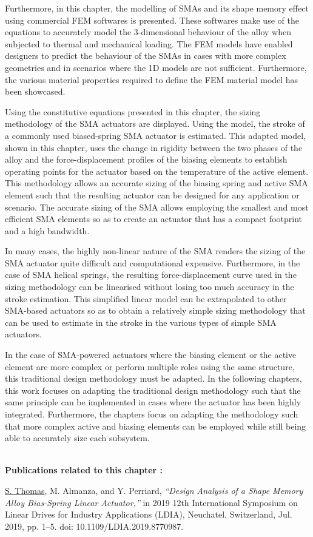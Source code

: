 Furthermore, in this chapter, the modelling of SMAs and its shape memory effect using commercial FEM softwares is presented. These softwares make use of the \cite{auricchioRobustIntegrationalgorithmFinitestrain2001} equations to accurately model the 3-dimensional behaviour of the alloy when subjected to thermal and mechanical loading. The FEM models have enabled designers to predict the behaviour of the SMAs in cases with more complex geometries and in scenarios where the 1D \cite{brinsonOneDimensionalConstitutiveBehavior1993} models are not sufficient. Furthermore, the various material properties required to define the FEM material model has been showcased.

Using the constitutive equations presented in this chapter, the sizing methodology of the SMA actuators are displayed. Using the \cite{brinsonOneDimensionalConstitutiveBehavior1993} model, the stroke of a commonly used biased-spring SMA actuator is estimated. This adapted model, shown in this chapter, uses the change in rigidity between the two phases of the alloy and the force-displacement profiles of the biasing elements to establish operating points for the actuator based on the temperature of the active element. This methodology allows an accurate sizing of the biasing spring and active SMA element such that the resulting actuator can be designed for any application or scenario. The accurate sizing of the SMA allows employing the smallest and most efficient SMA elements so as to create an actuator that has a compact footprint and a high bandwidth.

In many cases, the highly non-linear nature of the SMA renders the sizing of the SMA actuator quite difficult and computational expensive. Furthermore, in the case of SMA helical springs, the resulting force-displacement curve used in the sizing methodology can be linearised without losing too much accuracy in the stroke estimation. This simplified linear model can be extrapolated to other SMA-based actuators so as to obtain a relatively simple sizing methodology that can be used to estimate in the stroke in the various types of simple SMA actuators.

In the case of SMA-powered actuators where the biasing element or the active element are more complex or perform multiple roles using the same structure, this traditional design methodology must be adapted. In the following chapters, this work focuses on adapting the traditional design methodology such that the same principle can be implemented in cases where the actuator has been highly integrated. Furthermore, the chapters focus on adapting the methodology such that more complex active and biasing elements can be employed while still being able to accurately size each subsystem.

\vspace*{\fill}
\noindent\hrulefill \\
\textbf{\large Publications related to this chapter :}

\underline{S. Thomas}, M. Almanza, and Y. Perriard, \textit{“Design Analysis of a Shape Memory Alloy Bias-Spring Linear Actuator,”} in 2019 12th International Symposium on Linear Drives for Industry Applications (LDIA), Neuchatel, Switzerland, Jul. 2019, pp. 1–5. doi: 10.1109/LDIA.2019.8770987.
